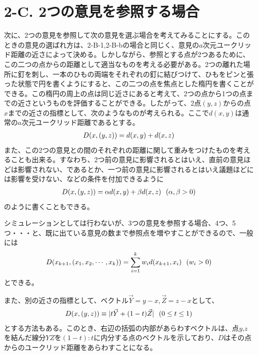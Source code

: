 \documentclass[letterpaper,10pt,english]{sphinxmanual}
\begin{document}
\section{2-C. 2つの意見を参照する場合}
\label{draft:c-2}
次に、2つの意見を参照して次の意見を選ぶ場合を考えてみることにする。このときの意見の選ばれ方は、2-B-1,2-B-bの場合と同じく、意見の\(a\)次元ユークリッド距離の近さによって決める。しかしながら、参照とする点が2つあるために、この二つの点からの距離として適当なものを考える必要がある。2つの離れた場所に釘を刺し、一本のひもの両端をそれぞれの釘に結びつけて、ひもをピンと張った状態で円を書くようにすると、この二つの点を焦点とした楕円を書くことができる。この楕円の周上の点は同じ近さにあると考えて、2つの点から1つの点までの近さというものを評価することができる。したがって、2点\((y,z)\)からの点\(x\)までの近さの指標として、次のようなものが考えられる。ここで\(d(x,y)\)は通常の\(a\)次元ユークリッド距離であるとする。
\begin{gather}
\begin{split}D(x,(y,z)) = d(x,y) + d(x,z)\end{split}\notag
\end{gather}
また、この2つの意見との間のそれぞれの距離に関して重みをつけたものを考えることも出来る。すなわち、2つ前の意見に影響されるとはいえ、直前の意見ほどは影響されない、であるとか、一つ前の意見に影響されるとはいえ議題ほどには影響を受けない、などの条件を付加できるように
\begin{gather}
\begin{split}D(x,(y,z)) = \alpha d(x,y) + \beta d(x,z)\ \ (\alpha, \beta > 0)\end{split}\notag
\end{gather}
のように書くこともできる。

シミュレーションとしては行わないが、3つの意見を参照する場合、4つ、5つ・・・と、既に出ている意見の数まで参照点を増やすことができるので、一般には
\begin{gather}
\begin{split}D(x_{k+1}, (x_{1}, x_{2}, \cdots , x_{k})) = \sum_{i=1}^{k}w_{i}d(x_{k+1},x_{i})\ \ (w_{i} > 0)\end{split}\notag
\end{gather}
とできる。

また、別の近さの指標として、ベクトル\(\vec{Y}=y-x, \vec{Z} = z-x\)として、
\begin{gather}
\begin{split}D(x, (y,z)) \equiv | t \vec{Y} + (1-t)\vec{Z}|\ \ (0 \le t \le 1)\end{split}\notag
\end{gather}
とする方法もある。このとき、右辺の括弧の内部があらわすベクトルは、点\(y\),\(z\)を結んだ線分\(YZ\)を\((1-t):t\)に内分する点のベクトルを示しており、\(D\)はその点からのユークリッド距離をあらわすことになる。
\end{document}
